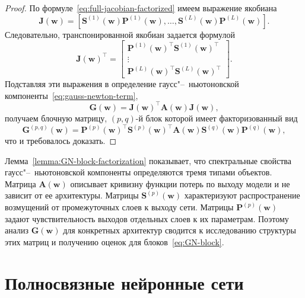 \begin{proof}
По формуле~\eqref{eq:full-jacobian-factorized} имеем выражение якобиана
\begin{equation}
    \mathbf{J}(\mathbf{w})
    =
    \left[
    \mathbf{S}^{(1)}(\mathbf{w})\mathbf{P}^{(1)}(\mathbf{w}),
    \ldots,
    \mathbf{S}^{(L)}(\mathbf{w})\mathbf{P}^{(L)}(\mathbf{w})
    \right].
\end{equation}
Следовательно, транспонированной якобиан задается формулой
\begin{equation}
    \mathbf{J}(\mathbf{w})^\top
    =
    \begin{bmatrix}
    \mathbf{P}^{(1)}(\mathbf{w})^\top \mathbf{S}^{(1)}(\mathbf{w})^\top\\
    \vdots\\
    \mathbf{P}^{(L)}(\mathbf{w})^\top \mathbf{S}^{(L)}(\mathbf{w})^\top
    \end{bmatrix}.
\end{equation}
Подставляя эти выражения в определение гаусс"--~ньютоновской компоненты~\eqref{eq:gauss-newton-term},
\begin{equation}
    \mathbf{G}(\mathbf{w})
    =
    \mathbf{J}(\mathbf{w})^\top \mathbf{A}(\mathbf{w}) \mathbf{J}(\mathbf{w}),
\end{equation}
получаем блочную матрицу, $(p, q)$-й блок которой имеет факторизованный вид
\begin{equation}
    \mathbf{G}^{(p, q)}(\mathbf{w})
    =
    \mathbf{P}^{(p)}(\mathbf{w})^\top
    \mathbf{S}^{(p)}(\mathbf{w})^\top
    \mathbf{A}(\mathbf{w})
    \mathbf{S}^{(q)}(\mathbf{w})
    \mathbf{P}^{(q)}(\mathbf{w}),
\end{equation}
что и требовалось доказать.
\end{proof}

Лемма~\ref{lemma:GN-block-factorization} показывает, что спектральные свойства гаусс"--~ньютоновской компоненты определяются тремя типами объектов. Матрица $\mathbf{A}(\mathbf{w})$ описывает кривизну функции потерь по выходу модели и не зависит от ее архитектуры. Матрицы $\mathbf{S}^{(p)}(\mathbf{w})$ характеризуют распространение возмущений от промежуточных слоев к выходу сети. Матрицы $\mathbf{P}^{(p)}(\mathbf{w})$ задают чувствительность выходов отдельных слоев к их параметрам. Поэтому анализ $\mathbf{G}(\mathbf{w})$ для конкретных архитектур сводится к исследованию структуры этих матриц и получению оценок для блоков~\eqref{eq:GN-block}.

\section{Полносвязные нейронные сети}

